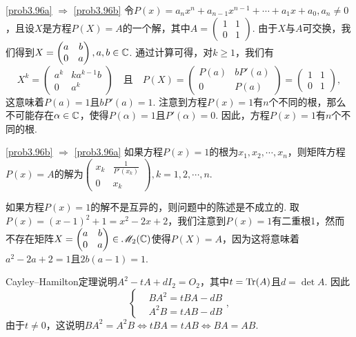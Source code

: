 \begin{solution}
  \ref{prob3.96a} $\Rightarrow$ \ref{prob3.96b} 令$P(x)=a_nx^n+a_{n-1}x^{n-1}+\cdots+a_1x+a_0,a_n\ne0$，且设$X$是方程$P(X)=A$的一个解，其中$A=\begin{pmatrix}
    1 & 1 \\
    0 & 1
  \end{pmatrix}$. 由于$X$与$A$可交换，我们得到$X=\begin{pmatrix}
    a & b \\
    0 & a
  \end{pmatrix},a,b\in\mathbb C$. 通过计算可得，对$k\ge1$，我们有
  \[
    X^k = \begin{pmatrix}
      a^k & ka^{k-1}b \\
      0 & a^k
    \end{pmatrix}\quad \text{且} \quad
    P(X) = \begin{pmatrix}
      P(a) & b P'(a) \\
      0 & P(a)
    \end{pmatrix} = \begin{pmatrix}
      1 & 1 \\
      0 & 1
    \end{pmatrix},
  \]
  这意味着$P(a)=1$且$bP'(a)=1$. 注意到方程$P(x)=1$有$n$个不同的根，那么不可能存在$\alpha\in\mathbb C$，使得$P(\alpha)=1$且$P'(\alpha)=0$. 因此，方程$P(x)=1$有$n$个不同的根.

  \ref{prob3.96b} $\Rightarrow$ \ref{prob3.96a} 如果方程$P(x)=1$的根为$x_1,x_2,\cdots,x_n$，则矩阵方程$P(x)=A$的解为$\begin{pmatrix}
    x_k & \frac1{P'(x_k)} \\
    0 & x_k
  \end{pmatrix},k=1,2,\cdots,n$.

  如果方程$P(x)=1$的解不是互异的，则问题中的陈述是不成立的. 取$P(x)=(x-1)^2+1=x^2-2x+2$，我们注意到$P(x)=1$有二重根1，然而不存在矩阵$X=\begin{pmatrix}
    a & b \\
    0 & a
  \end{pmatrix}\in\mathscr M_2(\mathbb C)$使得$P(X)=A$，因为这将意味着$a^2-2a+2=1$且$2b(a-1)=1$.
\end{solution}

\begin{solution}
  Cayley--Hamilton定理说明$A^2-tA+dI_2=O_2$，其中$t=\operatorname{Tr}(A)$且$d=\det A$. 因此
  \[
    \left\{
      \begin{aligned}
        & BA^2 = tBA - dB \\
        & A^2B = tAB - dB
      \end{aligned}
    \right.,
  \]
  由于$t\ne0$，这说明$BA^2=A^2B\Leftrightarrow tBA=tAB\Leftrightarrow BA=AB$.
\end{solution}

